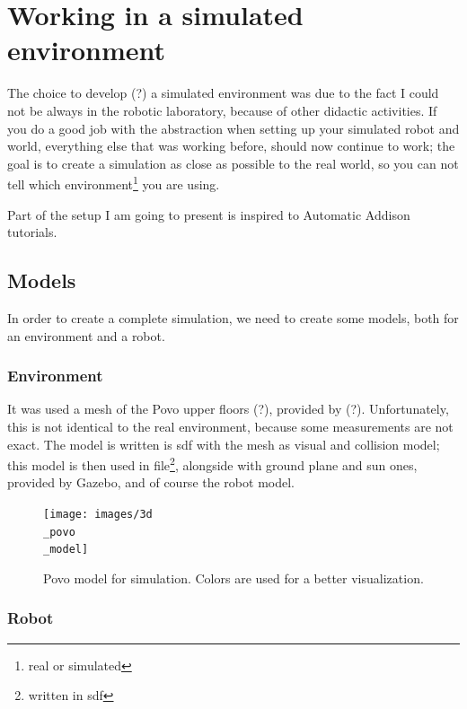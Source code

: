 \chapter{Working in a simulated environment}

The choice to develop (?) a simulated environment was due to the fact I could not be always in the robotic laboratory, because of other didactic activities. If you do a good job with the abstraction when setting up your simulated robot and world, everything else that was working before, should now continue to work; the goal is to create a simulation as close as possible to the real world, so you can not tell which environment\footnote{real or simulated} you are using.

Part of the setup I am going to present is inspired to Automatic Addison tutorials\cite{tutorials}.

\section{Models}

In order to create a complete simulation, we need to create some models, both for an environment and a robot.

\subsection*{Environment}

It was used a mesh of the Povo upper floors (?), provided by (?). Unfortunately, this is not identical to the real environment, because some measurements are not exact.
The model is written is \Acrfull{sdf} with the mesh as visual and collision model; this model is then used in  file\footnote{written in \Acrshort{sdf}}, alongside with ground plane and sun ones, provided by Gazebo, and of course the robot model.

\begin{figure}[h]
    \centering
    \texttt{[image: images/3d\\\_povo\\\_model]}
    \caption{Povo model for simulation. Colors are used for a better visualization.}
\end{figure}

\newpage

\subsection*{Robot}

